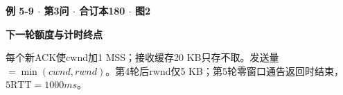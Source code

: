 {\color{ink}\bfseries 例 5-9 \(\cdot \) 第3问 \(\cdot \) 合订本180 \(\cdot \) 图2}\par \textbf{下一轮额度与计时终点}\par{}\par 每个新ACK使cwnd加1 MSS；接收缓存20 KB只存不取。发送量\(=\allowbreak{}\operatorname{min}(cwnd,\allowbreak{}rwnd)\)。第4轮后rwnd仅5 KB；第5轮零窗口通告返回时结束，\(5 \mathrm{RTT}=\allowbreak{}1000 ms\)。
